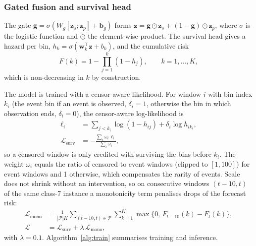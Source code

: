\subsubsection{Gated fusion and survival head}

The gate
$\mathbf{g}=\sigma(W_g[\mathbf{z}_s;\mathbf{z}_p]+\mathbf{b}_g)$ forms
$\mathbf{z}=\mathbf{g}\odot\mathbf{z}_s+(1-\mathbf{g})\odot\mathbf{z}_p$, where $\sigma$ is the logistic
function and $\odot$ the element-wise product. The survival head \citep{gensheimer2019,kvamme2021} gives a hazard per
bin, $h_k=\sigma(\mathbf{w}_k^{\top}\mathbf{z}+b_k)$, and the cumulative risk
\begin{equation}
F(k)=1-\prod_{j=1}^{k}(1-h_j),\qquad k=1,\dots,K,
\label{eq:cdf}
\end{equation}
which is non-decreasing in $k$ by construction.

The model is trained with a censor-aware likelihood. For window $i$ with bin index $k_i$ (the event bin if an event is observed, $\delta_i=1$, otherwise the bin
in which observation ends, $\delta_i=0$), the censor-aware log-likelihood is
\begin{align}
\ell_i&=\sum_{j<k_i}\log(1-h_{ij})+\delta_i\log h_{ik_i},\nonumber\\
\mathcal{L}_{\mathrm{surv}}&=-\frac{\sum_i \omega_i\,\ell_i}{\sum_i \omega_i},
\label{eq:nll}
\end{align}
so a censored window is only credited with surviving the bins before $k_i$. The weight $\omega_i$ equals the
ratio of censored to event windows (clipped to $[1,100]$) for event windows and 1 otherwise, which
compensates the rarity of events. Scale does not shrink without an intervention, so on consecutive windows
$(t-10,t)$ of the same class-7 instance a monotonicity term penalises drops of the forecast risk:
\begin{align}
\mathcal{L}_{\mathrm{mono}}&=\frac{1}{|\mathcal{P}|K}\sum_{(t-10,t)\in\mathcal{P}}\sum_{k=1}^{K}
\max\{0,\,F_{t-10}(k)-F_t(k)\},\nonumber\\
\mathcal{L}&=\mathcal{L}_{\mathrm{surv}}+\lambda\,\mathcal{L}_{\mathrm{mono}},
\label{eq:loss}
\end{align}
with $\lambda=0.1$. Algorithm~\ref{alg:train} summarises training and inference.

